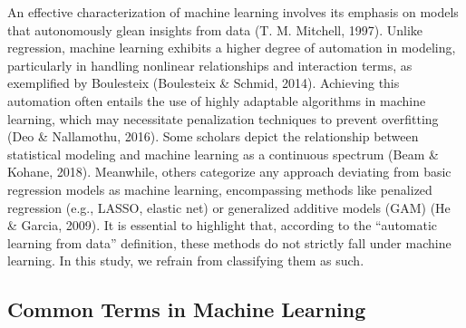 \documentclass[
  man]{apa7}
\begin{document}
An effective characterization of machine learning involves its emphasis on models that autonomously glean insights from data (T. M. Mitchell, 1997).
Unlike regression, machine learning exhibits a higher degree of automation in modeling, particularly in handling nonlinear relationships and interaction terms, as exemplified by Boulesteix (Boulesteix \& Schmid, 2014).
Achieving this automation often entails the use of highly adaptable algorithms in machine learning, which may necessitate penalization techniques to prevent overfitting (Deo \& Nallamothu, 2016).
Some scholars depict the relationship between statistical modeling and machine learning as a continuous spectrum (Beam \& Kohane, 2018).
Meanwhile, others categorize any approach deviating from basic regression models as machine learning, encompassing methods like penalized regression (e.g., LASSO, elastic net) or generalized additive models (GAM) (He \& Garcia, 2009).
It is essential to highlight that, according to the ``automatic learning from data'' definition, these methods do not strictly fall under machine learning.
In this study, we refrain from classifying them as such.

\hypertarget{common-terms-in-machine-learning}{%
\subsection{Common Terms in Machine Learning}\label{common-terms-in-machine-learning}}
\end{document}
